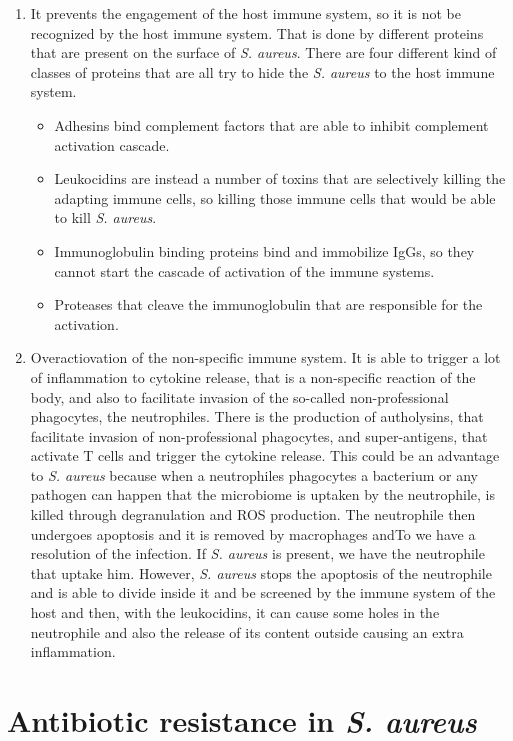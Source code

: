 \begin{enumerate}
    \item It prevents the engagement of the host immune system, so it is not be recognized by the host immune system. That is done by different proteins that are present on the surface of \emph{S. aureus}. There are four different kind of classes of proteins that are all try to hide the \emph{S. aureus} to the host immune system.
    \begin{itemize}
        \item Adhesins bind complement factors that are able to inhibit complement activation cascade.
        \item Leukocidins are instead a number of toxins that are selectively killing the adapting immune cells, so killing those immune cells that would be able to kill \emph{S. aureus}. 
        \item Immunoglobulin binding proteins bind and immobilize IgGs, so they cannot start the cascade of activation of the immune systems.
        \item Proteases that cleave the immunoglobulin that are responsible for the activation.
    \end{itemize}
    \item Overactiovation of the non-specific immune system. It is able to trigger a lot of inflammation to cytokine release, that is a non-specific reaction of the body, and also to facilitate invasion of the so-called non-professional phagocytes, the neutrophiles. There is the production of autholysins, that facilitate invasion of non-professional phagocytes, and super-antigens, that activate T cells and trigger the cytokine release. This could be an advantage to \emph{S. aureus} because when a neutrophiles phagocytes a bacterium or any pathogen can happen that the microbiome is uptaken by the neutrophile, is killed through degranulation and ROS production. The neutrophile then undergoes apoptosis and it is removed by macrophages andTo we have a resolution of the infection. 
    If \emph{S. aureus} is present, we have the neutrophile that uptake him. However, \emph{S. aureus} stops the apoptosis of the neutrophile and is able to divide inside it and be screened by the immune system of the host and then, with the leukocidins, it can cause some holes in the neutrophile and also the release of its content outside causing an extra inflammation. 
\end{enumerate}

\section{Antibiotic resistance in \emph{S. aureus}}

